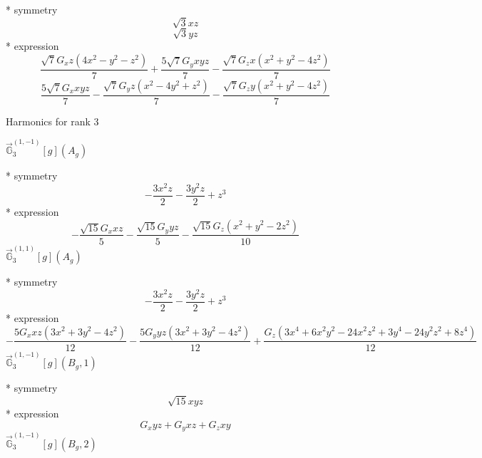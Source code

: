 \documentclass[fleqn,8pt]{jsarticle}
\begin{document}
\noindent\quad ** symmetry
\begin{dmath*}
\sqrt{3} x z
\end{dmath*}
\begin{dmath*}
\sqrt{3} y z
\end{dmath*}
\noindent\quad ** expression
\begin{dmath*}
\frac{\sqrt{7} G_{x} z \left(4 x^{2} - y^{2} - z^{2}\right)}{7} + \frac{5 \sqrt{7} G_{y} x y z}{7} - \frac{\sqrt{7} G_{z} x \left(x^{2} + y^{2} - 4 z^{2}\right)}{7}
\end{dmath*}
\begin{dmath*}
\frac{5 \sqrt{7} G_{x} x y z}{7} - \frac{\sqrt{7} G_{y} z \left(x^{2} - 4 y^{2} + z^{2}\right)}{7} - \frac{\sqrt{7} G_{z} y \left(x^{2} + y^{2} - 4 z^{2}\right)}{7}
\end{dmath*}

\noindent * Harmonics for rank 3

\noindent\quad $\vec{\mathbb{G}}_{3}^{(1,-1)}[g](A_{g})$

\noindent\quad ** symmetry
\begin{dmath*}
- \frac{3 x^{2} z}{2} - \frac{3 y^{2} z}{2} + z^{3}
\end{dmath*}
\noindent\quad ** expression
\begin{dmath*}
- \frac{\sqrt{15} G_{x} x z}{5} - \frac{\sqrt{15} G_{y} y z}{5} - \frac{\sqrt{15} G_{z} \left(x^{2} + y^{2} - 2 z^{2}\right)}{10}
\end{dmath*}
\noindent\quad $\vec{\mathbb{G}}_{3}^{(1,1)}[g](A_{g})$

\noindent\quad ** symmetry
\begin{dmath*}
- \frac{3 x^{2} z}{2} - \frac{3 y^{2} z}{2} + z^{3}
\end{dmath*}
\noindent\quad ** expression
\begin{dmath*}
- \frac{5 G_{x} x z \left(3 x^{2} + 3 y^{2} - 4 z^{2}\right)}{12} - \frac{5 G_{y} y z \left(3 x^{2} + 3 y^{2} - 4 z^{2}\right)}{12} + \frac{G_{z} \left(3 x^{4} + 6 x^{2} y^{2} - 24 x^{2} z^{2} + 3 y^{4} - 24 y^{2} z^{2} + 8 z^{4}\right)}{12}
\end{dmath*}
\noindent\quad $\vec{\mathbb{G}}_{3}^{(1,-1)}[g](B_{g},1)$

\noindent\quad ** symmetry
\begin{dmath*}
\sqrt{15} x y z
\end{dmath*}
\noindent\quad ** expression
\begin{dmath*}
G_{x} y z + G_{y} x z + G_{z} x y
\end{dmath*}
\noindent\quad $\vec{\mathbb{G}}_{3}^{(1,-1)}[g](B_{g},2)$
\end{document}
